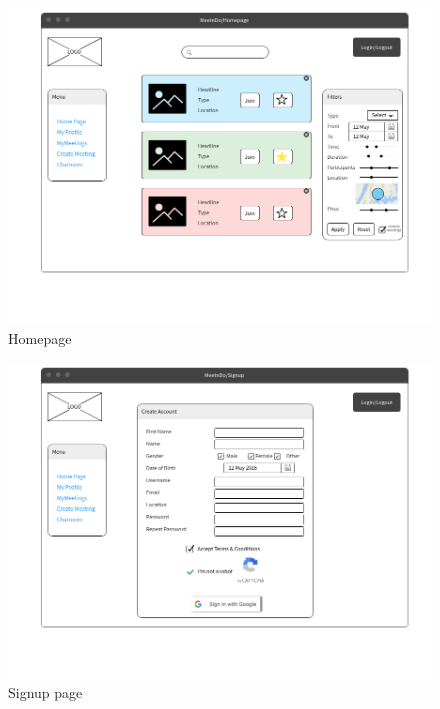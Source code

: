 \documentclass[conference]{IEEEtran}
\begin{document}
\begin{figure}
  \centering
  \includegraphics[scale=0.3]{pics/mockups/Homepage.png}\quad
  \caption { Homepage}
\end{figure}

\begin{figure}
  \centering
  \includegraphics[scale=0.3]{pics/mockups/Signup.png}\quad
  \caption { Signup page}
\end{figure}
\end{document}
